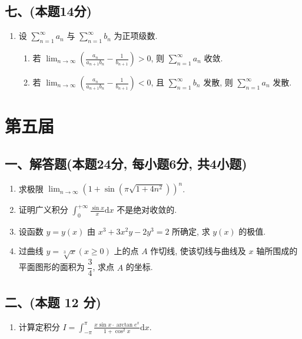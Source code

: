 \subsection*{七、(本题14分)}
\begin{enumerate}[start=11]
    \item 设 $\displaystyle\sum_{n=1}^{\infty} a_n$ 与 $\displaystyle\sum_{n=1}^{\infty} b_n$ 为正项级数.
          \begin{enumerate}
              \item [(1)] 若 $\displaystyle\lim_{n \to \infty} \left( \frac{a_n}{a_{n+1}b_n} - \frac{1}{b_{n+1}} \right) > 0$,  则 $\displaystyle\sum_{n=1}^{\infty} a_n$ 收敛.
              \item [(2)] 若 $\displaystyle\lim_{n \to \infty} \left( \frac{a_n}{a_{n+1}b_n} - \frac{1}{b_{n+1}} \right) < 0$,  且 $\displaystyle\sum_{n=1}^{\infty} b_n$ 发散,  则 $\displaystyle\sum_{n=1}^{\infty} a_n$ 发散.
          \end{enumerate}
\end{enumerate}


\newpage
\section{第五届}

\subsection*{一、解答题(本题24分,  每小题6分,  共4小题)}
\begin{enumerate}
    \item 求极限 $\displaystyle\lim_{n \to \infty} \left(1 + \sin(\pi \sqrt{1 + 4n^2})\right)^n$.
    \item 证明广义积分 $\displaystyle\int_0^{+\infty} \frac{\sin x}{x}  \mathrm{d}x$ 不是绝对收敛的.
    \item 设函数 $y = y(x)$ 由 $x^3 + 3x^2y - 2y^3 = 2$ 所确定,  求 $y(x)$ 的极值.
    \item 过曲线 $y = \sqrt[3]{x} (x \geq 0)$ 上的点 $A$ 作切线,  使该切线与曲线及 $x$ 轴所围成的平面图形的面积为 $\dfrac{3}{4}$,  求点 $A$ 的坐标.
\end{enumerate}

\subsection*{二、(本题 12 分)}
\begin{enumerate}[start=5]
    \item 计算定积分 $I = \displaystyle\int_{-\pi}^{\pi} \frac{x \sin x \cdot \arctan e^x}{1 + \cos^2 x}  \mathrm{d}x$.
\end{enumerate}

